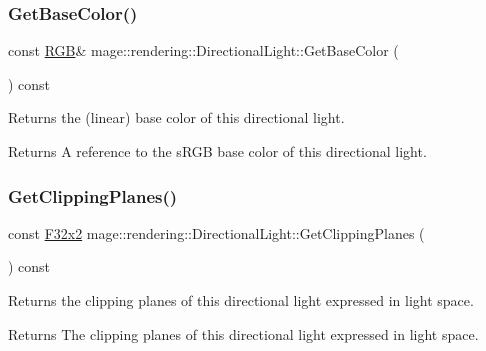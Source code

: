 \subsubsection{\texorpdfstring{Get\+Base\+Color()}{GetBaseColor()}\hspace{0.1cm}{\footnotesize\ttfamily [2/2]}}
{\footnotesize\ttfamily const \mbox{\hyperlink{structmage_1_1_r_g_b}{R\+GB}}\& mage\+::rendering\+::\+Directional\+Light\+::\+Get\+Base\+Color (\begin{DoxyParamCaption}{ }\end{DoxyParamCaption}) const\hspace{0.3cm}{\ttfamily [noexcept]}}

Returns the (linear) base color of this directional light.

\begin{DoxyReturn}{Returns}
A reference to the s\+R\+GB base color of this directional light. 
\end{DoxyReturn}
\mbox{\label{classmage_1_1rendering_1_1_directional_light_a178b7c303793864eaa0d58c81256760d}} 
\subsubsection{\texorpdfstring{Get\+Clipping\+Planes()}{GetClippingPlanes()}}
{\footnotesize\ttfamily const \mbox{\hyperlink{namespacemage_aee4759dedc8def6c6dec26b5c7eddf29}{F32x2}} mage\+::rendering\+::\+Directional\+Light\+::\+Get\+Clipping\+Planes (\begin{DoxyParamCaption}{ }\end{DoxyParamCaption}) const\hspace{0.3cm}{\ttfamily [noexcept]}}

Returns the clipping planes of this directional light expressed in light space.

\begin{DoxyReturn}{Returns}
The clipping planes of this directional light expressed in light space. 
\end{DoxyReturn}
\mbox{\label{classmage_1_1rendering_1_1_directional_light_a1cba2b0099366af146c3ccf364946bf8}} 
